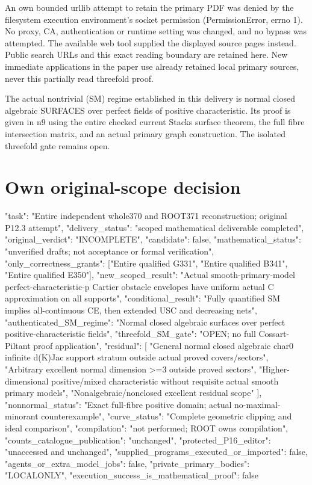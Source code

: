 \documentclass[11pt]{article}
\begin{document}
An own bounded urllib attempt to retain the primary PDF was denied by the filesystem execution environment's socket permission (PermissionError, errno 1). No proxy, CA, authentication or runtime setting was changed, and no bypass was attempted. The available web tool supplied the displayed source pages instead. Public search URLs and this exact reading boundary are retained here. New immediate applications in the paper use already retained local primary sources, never this partially read threefold proof.

The actual nontrivial (SM) regime established in this delivery is normal closed algebraic SURFACES over perfect fields of positive characteristic. Its proof is given in n9 using the entire checked current Stacks surface theorem, the full fibre intersection matrix, and an actual primary graph construction. The isolated threefold gate remains open. 
\section{Own original-scope decision}
\begin{ImportedGrantText}
{
  "task": "Entire independent whole370 and ROOT371 reconstruction; original P12.3 attempt",
  "delivery_status": "scoped mathematical deliverable completed",
  "original_verdict": "INCOMPLETE",
  "candidate": false,
  "mathematical_status": "unverified drafts; not acceptance or formal verification",
  "only_correctness_grants": ["Entire qualified G331", "Entire qualified B341", "Entire qualified E350"],
  "new_scoped_result": "Actual smooth-primary-model perfect-characteristic-p Cartier obstacle envelopes have uniform actual C approximation on all supports",
  "conditional_result": "Fully quantified SM implies all-continuous CE, then extended USC and decreasing nets",
  "authenticated_SM_regime": "Normal closed algebraic surfaces over perfect positive-characteristic fields",
  "threefold_SM_gate": "OPEN; no full Cossart-Piltant proof application",
  "residual": [
    "General normal closed algebraic char0 infinite d(K)Jac support stratum outside actual proved covers/sectors",
    "Arbitrary excellent normal dimension >=3 outside proved sectors",
    "Higher-dimensional positive/mixed characteristic without requisite actual smooth primary models",
    "Nonalgebraic/nonclosed excellent residual scope"
  ],
  "nonnormal_status": "Exact full-fibre positive domain; actual no-maximal-minorant counterexample",
  "curve_status": "Complete geometric clipping and ideal comparison",
  "compilation": "not performed; ROOT owns compilation",
  "counts_catalogue_publication": "unchanged",
  "protected_P16_editor": "unaccessed and unchanged",
  "supplied_programs_executed_or_imported": false,
  "agents_or_extra_model_jobs": false,
  "private_primary_bodies": "LOCALONLY",
  "execution_success_is_mathematical_proof": false
}

\end{ImportedGrantText}
\end{document}
